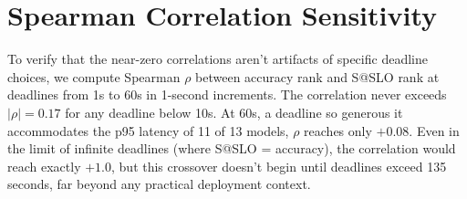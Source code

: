 \documentclass[11pt]{article}
\begin{document}
\section{Spearman Correlation Sensitivity}
\label{app:sensitivity}

To verify that the near-zero correlations aren't artifacts of specific deadline choices, we compute Spearman $\rho$ between accuracy rank and S@SLO rank at deadlines from 1s to 60s in 1-second increments.  The correlation never exceeds $|\rho| = 0.17$ for any deadline below 10s.  At 60s, a deadline so generous it accommodates the p95 latency of 11 of 13 models, $\rho$ reaches only $+0.08$.  Even in the limit of infinite deadlines (where S@SLO = accuracy), the correlation would reach exactly $+1.0$, but this crossover doesn't begin until deadlines exceed 135 seconds, far beyond any practical deployment context.
\end{document}
